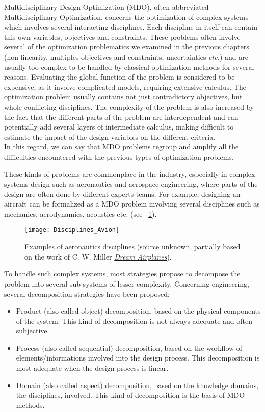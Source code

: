 Multidisciplinary Design Optimization (MDO), often abbreviated Multidisciplinary Optimization, concerns the optimization of complex systems which involves several interacting disciplines. Each discipline in itself can contain this own variables, objectives and constraints. These problems often involve several of the optimization problematics we examined in the previous chapters (non-linearity, multiples objectives and constraints, uncertainties \emph{etc.}) and are usually too complex to be handled by classical optimization methods for several reasons. Evaluating the global function of the problem is considered to be expensive, as it involve complicated models, requiring extensive calculus. The optimization problem usually contains not just contradictory objectives, but whole conflicting disciplines. The complexity of the problem is also increased by the fact that the different parts of the problem are interdependent and can potentially add several layers of intermediate calculus, making difficult to estimate the impact of the design variables on the different criteria.\\
In this regard, we can say that MDO problems regroup and amplify all the difficulties encountered with the previous types of optimization problems.

These kinds of problems are commonplace in the industry, especially in complex systems design such as aeronautics and aerospace engineering, where parts of the design are often done by different experts teams. For example, designing an aircraft can be formalized as a MDO problem involving several disciplines such as mechanics, aerodynamics, acoustics etc. (see \figurename\ \ref{aero-disc}).

\begin{figure}
\centering
\texttt{[image: Disciplines\_Avion]}
\caption{Examples of aeronautics disciplines (source unknown, partially based on the work of C. W. Miller \href{http://thehuwaldtfamily.org/jtrl/research/Airplane\%20Design/Dream\%20Airplane\%20Systems\%20Bias.pdf}{\emph{Dream Airplanes}}).}
\label{aero-disc}
\end{figure}

To handle such complex systems, most strategies propose to decompose the problem into several sub-systems of lesser complexity. Concerning engineering, several decomposition strategies have been proposed\cite{kusiak1995decomposition}:

\begin{itemize}
\item Product (also called object) decomposition, based on the physical components of the system. This kind of decomposition is not always adequate and often subjective.
\item Process (also called sequential) decomposition, based on the workflow of elements/informations involved into the design process. This decomposition is most adequate when the design process is linear.
\item Domain (also called aspect) decomposition, based on the knowledge domains, the disciplines, involved. This kind of decomposition is the basis of MDO methods.
\end{itemize}

